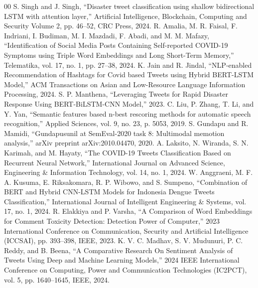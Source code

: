 \documentclass[conference]{IEEEtran}
\begin{document}
\begin{thebibliography}{00}
 S. Singh and J. Singh, ``Disaster tweet classification using shallow bidirectional LSTM with attention layer,'' Artificial Intelligence, Blockchain, Computing and Security Volume 2, pp. 46--52, CRC Press, 2024.
 R. Amalia, M. R. Faisal, F. Indriani, I. Budiman, M. I. Mazdadi, F. Abadi, and M. M. Mafazy, ``Identification of Social Media Posts Containing Self-reported COVID-19 Symptoms using Triple Word Embeddings and Long Short-Term Memory,'' Telematika, vol. 17, no. 1, pp. 27--38, 2024.
 K. Jain and R. Jindal, ``NLP-enabled Recommendation of Hashtags for Covid based Tweets using Hybrid BERT-LSTM Model,'' ACM Transactions on Asian and Low-Resource Language Information Processing, 2024.
 S. P. Manthena, ``Leveraging Tweets for Rapid Disaster Response Using BERT-BiLSTM-CNN Model,'' 2023.
 C. Liu, P. Zhang, T. Li, and Y. Yan, ``Semantic features based n-best rescoring methods for automatic speech recognition,'' Applied Sciences, vol. 9, no. 23, p. 5053, 2019.
 S. Gundapu and R. Mamidi, ``Gundapusunil at SemEval-2020 task 8: Multimodal memotion analysis,'' arXiv preprint arXiv:2010.04470, 2020.
 A. Laksito, N. Wiranda, S. N. Karimah, and M. Hayaty, ``The COVID-19 Tweets Classification Based on Recurrent Neural Network,'' International Journal on Advanced Science, Engineering \& Information Technology, vol. 14, no. 1, 2024.
 W. Anggraeni, M. F. A. Kusuma, E. Riksakomara, R. P. Wibowo, and S. Sumpeno, ``Combination of BERT and Hybrid CNN-LSTM Models for Indonesia Dengue Tweets Classification,'' International Journal of Intelligent Engineering \& Systems, vol. 17, no. 1, 2024.
 R. Elakkiya and P. Varsha, ``A Comparison of Word Embeddings for Comment Toxicity Detection: Detection Power of Computer,'' 2023 International Conference on Communication, Security and Artificial Intelligence (ICCSAI), pp. 393--398, IEEE, 2023.
 K. V. C. Madhav, S. V. Mudunuri, P. C. Reddy, and B. Beena, ``A Comparative Research On Sentiment Analysis of Tweets Using Deep and Machine Learning Models,'' 2024 IEEE International Conference on Computing, Power and Communication Technologies (IC2PCT), vol. 5, pp. 1640--1645, IEEE, 2024.
\end{thebibliography}
\end{document}
